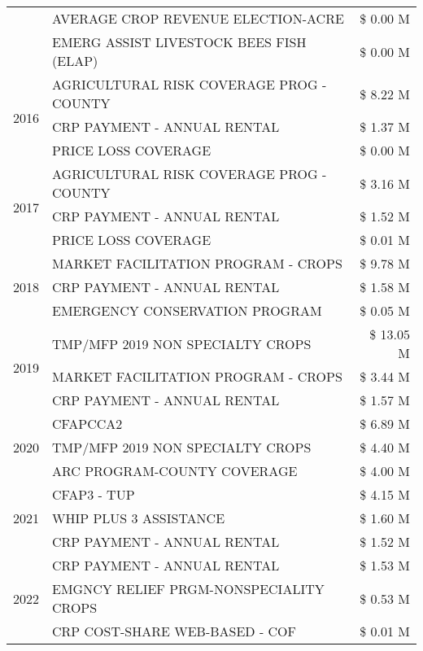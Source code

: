 \begin{tabular}{llr}
 & AVERAGE CROP REVENUE ELECTION-ACRE & \$ 0.00 M \\
 & EMERG ASSIST LIVESTOCK BEES FISH (ELAP) & \$ 0.00 M \\
\cline{1-3}
\multirow[t]{3}{*}{2016} & AGRICULTURAL RISK COVERAGE PROG - COUNTY & \$ 8.22 M \\
 & CRP PAYMENT - ANNUAL RENTAL & \$ 1.37 M \\
 & PRICE LOSS COVERAGE & \$ 0.00 M \\
\cline{1-3}
\multirow[t]{3}{*}{2017} & AGRICULTURAL RISK COVERAGE PROG - COUNTY & \$ 3.16 M \\
 & CRP PAYMENT - ANNUAL RENTAL & \$ 1.52 M \\
 & PRICE LOSS COVERAGE & \$ 0.01 M \\
\cline{1-3}
\multirow[t]{3}{*}{2018} & MARKET FACILITATION PROGRAM - CROPS & \$ 9.78 M \\
 & CRP PAYMENT - ANNUAL RENTAL & \$ 1.58 M \\
 & EMERGENCY CONSERVATION PROGRAM & \$ 0.05 M \\
\cline{1-3}
\multirow[t]{3}{*}{2019} & TMP/MFP 2019 NON SPECIALTY CROPS & \$ 13.05 M \\
 & MARKET FACILITATION PROGRAM - CROPS & \$ 3.44 M \\
 & CRP PAYMENT - ANNUAL RENTAL & \$ 1.57 M \\
\cline{1-3}
\multirow[t]{3}{*}{2020} & CFAPCCA2 & \$ 6.89 M \\
 & TMP/MFP 2019 NON SPECIALTY CROPS & \$ 4.40 M \\
 & ARC PROGRAM-COUNTY COVERAGE & \$ 4.00 M \\
\cline{1-3}
\multirow[t]{3}{*}{2021} & CFAP3 - TUP & \$ 4.15 M \\
 & WHIP PLUS 3 ASSISTANCE & \$ 1.60 M \\
 & CRP PAYMENT - ANNUAL RENTAL & \$ 1.52 M \\
\cline{1-3}
\multirow[t]{3}{*}{2022} & CRP PAYMENT - ANNUAL RENTAL & \$ 1.53 M \\
 & EMGNCY RELIEF PRGM-NONSPECIALITY CROPS & \$ 0.53 M \\
 & CRP COST-SHARE WEB-BASED - COF & \$ 0.01 M \\
\cline{1-3}
\bottomrule
\end{tabular}
